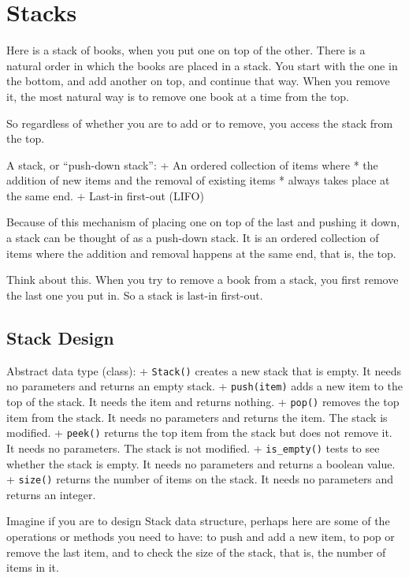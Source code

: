 \documentclass[
  letterpaper,
]{scrbook}
\begin{document}
\section*{Stacks}\label{stacks}


Here is a stack of books, when you put one on top of the other. There is
a natural order in which the books are placed in a stack. You start with
the one in the bottom, and add another on top, and continue that way.
When you remove it, the most natural way is to remove one book at a time
from the top.

So regardless of whether you are to add or to remove, you access the
stack from the top.

A stack, or ``push-down stack'': + An ordered collection of items where
* the addition of new items and the removal of existing items * always
takes place at the same end. + Last-in first-out (LIFO)

Because of this mechanism of placing one on top of the last and pushing
it down, a stack can be thought of as a push-down stack. It is an
ordered collection of items where the addition and removal happens at
the same end, that is, the top.

Think about this. When you try to remove a book from a stack, you first
remove the last one you put in. So a stack is last-in first-out.

\subsection*{Stack Design}\label{stack-design}

Abstract data type (class): + \texttt{Stack()} creates a new stack that
is empty. It needs no parameters and returns an empty stack. +
\texttt{push(item)} adds a new item to the top of the stack. It needs
the item and returns nothing. + \texttt{pop()} removes the top item from
the stack. It needs no parameters and returns the item. The stack is
modified. + \texttt{peek()} returns the top item from the stack but does
not remove it. It needs no parameters. The stack is not modified. +
\texttt{is\_empty()} tests to see whether the stack is empty. It needs
no parameters and returns a boolean value. + \texttt{size()} returns the
number of items on the stack. It needs no parameters and returns an
integer.

Imagine if you are to design Stack data structure, perhaps here are some
of the operations or methods you need to have: to push and add a new
item, to pop or remove the last item, and to check the size of the
stack, that is, the number of items in it.
\end{document}
